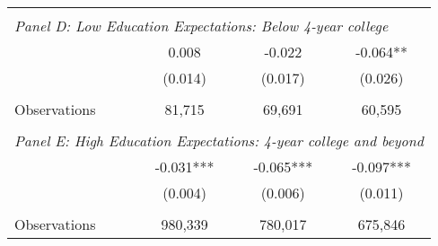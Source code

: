 {\begin{tabular}{lccc}
&  &  &   \\
\multicolumn{4}{l}{\textit{Panel D: Low Education Expectations: Below 4-year college}} \\
\hspace{3mm}        &       0.008   &      -0.022   &      -0.064** \\
                    &     (0.014)   &     (0.017)   &     (0.026)   \\
                    &               &               &               \\
\hspace{3mm}Observations&      81,715   &      69,691   &      60,595   \\
 
&  &  &   \\
\multicolumn{4}{l}{\textit{Panel E: High Education Expectations: 4-year college and beyond}} \\
\hspace{3mm}        &      -0.031***&      -0.065***&      -0.097***\\
                    &     (0.004)   &     (0.006)   &     (0.011)   \\
                    &               &               &               \\
\hspace{3mm}Observations&     980,339   &     780,017   &     675,846   \\
 

\bottomrule
\end{tabular}
}
